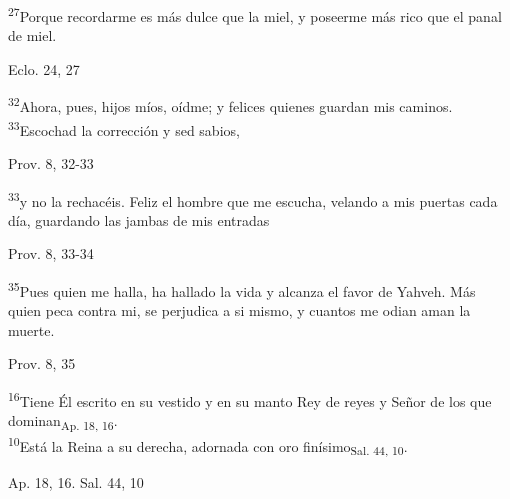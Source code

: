 \documentclass[a4paper,11pt]{article}
\begin{document}
      \textsuperscript{27}Porque recordarme es más dulce que la miel, y poseerme más rico que el panal de miel.
      \begin{flushright}
        Eclo. 24, 27
      \end{flushright}

      \textsuperscript{32}Ahora, pues, hijos míos, oídme; y felices quienes guardan mis caminos. \textsuperscript{33}Escochad la corrección y sed sabios,
      \begin{flushright}
        Prov. 8, 32-33
      \end{flushright}

      \textsuperscript{33}y no la rechacéis. Feliz el hombre que me escucha, velando a mis puertas cada día,
      guardando las jambas de mis entradas
      \begin{flushright}
        Prov. 8, 33-34
      \end{flushright}

      \textsuperscript{35}Pues quien me halla, ha hallado la vida y alcanza el favor de Yahveh. Más quien peca contra mi, se perjudica a si mismo,
      y cuantos me odian aman la muerte.
      \begin{flushright}
        Prov. 8, 35
      \end{flushright}

      \textsuperscript{16}Tiene Él escrito en su vestido y en su manto Rey de reyes y Señor de los que dominan\textsubscript{Ap. 18, 16}.  \\
      \textsuperscript{10}Está la Reina a su derecha, adornada con oro finísimo\textsubscript{Sal. 44, 10}.
      \begin{flushright}
        Ap. 18, 16. Sal. 44, 10
      \end{flushright}
\end{document}
